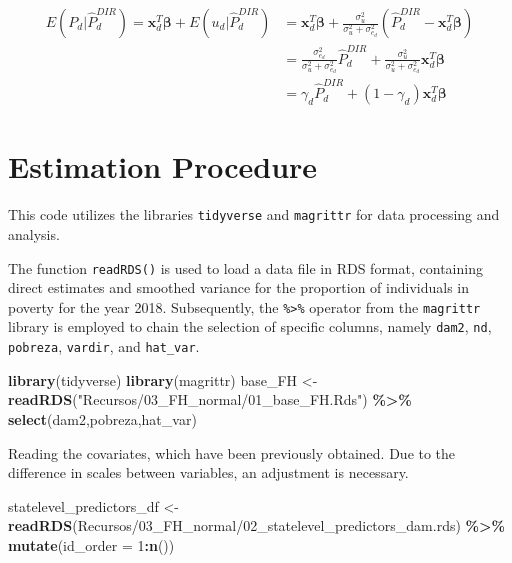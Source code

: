 \documentclass[
  12pt,
]{book}
\newenvironment{Shaded}{\begin{snugshade}}{\end{snugshade}}
\newcommand{\AttributeTok}[1]{\textcolor[rgb]{0.13,0.29,0.53}{#1}}
\newcommand{\DecValTok}[1]{\textcolor[rgb]{0.00,0.00,0.81}{#1}}
\newcommand{\FunctionTok}[1]{\textcolor[rgb]{0.13,0.29,0.53}{\textbf{#1}}}
\newcommand{\NormalTok}[1]{#1}
\newcommand{\OtherTok}[1]{\textcolor[rgb]{0.56,0.35,0.01}{#1}}
\newcommand{\SpecialCharTok}[1]{\textcolor[rgb]{0.81,0.36,0.00}{\textbf{#1}}}
\newcommand{\StringTok}[1]{\textcolor[rgb]{0.31,0.60,0.02}{#1}}
\begin{document}
\begin{align*}
E(P_d | \hat{P}^{DIR}_d) = \boldsymbol{x}^{T}_{d}\boldsymbol \beta + E(u_d|\hat{P}^{DIR}_d) & =  \boldsymbol{x}^{T}_{d}\boldsymbol \beta + \frac{\sigma_u^2}{\sigma_u^2 +\sigma_{e_d}^2}(\hat{P}^{DIR}_d-\boldsymbol{x}^{T}_{d}\boldsymbol \beta) \\
& = \frac{\sigma_{e_d}^2}{\sigma_u^2 +\sigma_{e_d}^2}\hat{P}^{DIR}_d + \frac{\sigma_u^2}{\sigma_u^2 +\sigma_{e_d}^2}\boldsymbol{x}^{T}_{d}\boldsymbol \beta \\
& = \gamma_d\hat{P}^{DIR}_d + (1-\gamma_d)\boldsymbol{x}^{T}_{d}\boldsymbol \beta
\end{align*}

\hypertarget{estimation-procedure}{%
\section{Estimation Procedure}\label{estimation-procedure}}

This code utilizes the libraries \texttt{tidyverse} and \texttt{magrittr} for data processing and analysis.

The function \texttt{readRDS()} is used to load a data file in RDS format, containing direct estimates and smoothed variance for the proportion of individuals in poverty for the year 2018. Subsequently, the \texttt{\%\textgreater{}\%} operator from the \texttt{magrittr} library is employed to chain the selection of specific columns, namely \texttt{dam2}, \texttt{nd}, \texttt{pobreza}, \texttt{vardir}, and \texttt{hat\_var}.

\begin{Shaded}
\begin{Highlighting}[]
\FunctionTok{library}\NormalTok{(tidyverse)}
\FunctionTok{library}\NormalTok{(magrittr)}
\NormalTok{base\_FH }\OtherTok{\textless{}{-}} \FunctionTok{readRDS}\NormalTok{(}\StringTok{"Recursos/03\_FH\_normal/01\_base\_FH.Rds"}\NormalTok{) }\SpecialCharTok{\%\textgreater{}\%} 
  \FunctionTok{select}\NormalTok{(dam2,pobreza,hat\_var)}
\end{Highlighting}
\end{Shaded}

Reading the covariates, which have been previously obtained. Due to the difference in scales between variables, an adjustment is necessary.

\begin{Shaded}
\begin{Highlighting}[]
\NormalTok{statelevel\_predictors\_df }\OtherTok{\textless{}{-}}
  \FunctionTok{readRDS}\NormalTok{(}\StringTok{\textquotesingle{}Recursos/03\_FH\_normal/02\_statelevel\_predictors\_dam.rds\textquotesingle{}}\NormalTok{) }\SpecialCharTok{\%\textgreater{}\%} 
  \FunctionTok{mutate}\NormalTok{(}\AttributeTok{id\_order =} \DecValTok{1}\SpecialCharTok{:}\FunctionTok{n}\NormalTok{())}
\end{Highlighting}
\end{Shaded}
\end{document}
